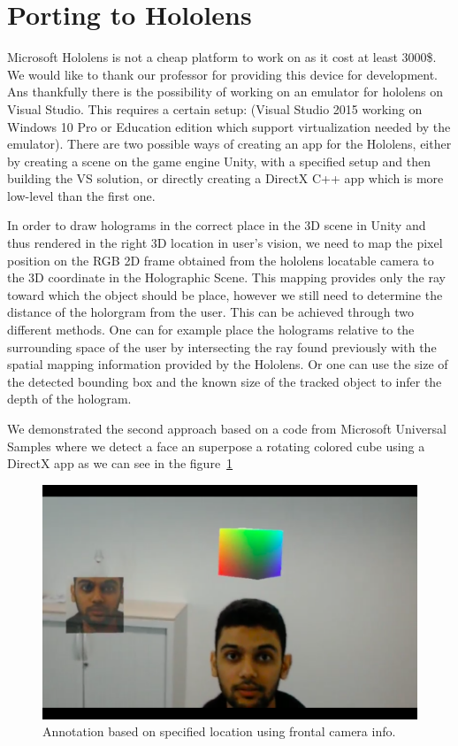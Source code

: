 \documentclass[10pt,twocolumn,letterpaper]{article}
\begin{document}
\section{Porting to Hololens}
Microsoft Hololens is not a cheap platform to work on as it cost at least 3000\$. We would like to thank our professor for providing this device for development. Ans thankfully there is the possibility of working on an emulator for hololens on Visual Studio. This requires a certain setup: (Visual Studio 2015 working on Windows 10 Pro or Education edition which support virtualization needed by the emulator). There are two possible ways of creating an app for the Hololens, either by creating a scene on the game engine Unity, with a specified setup and then building the VS solution, or directly creating a DirectX C++ app which is more low-level than the first one.

In order to draw holograms in the correct place in the 3D scene in Unity and thus rendered in the right 3D location in user's vision, we need to map the pixel position on the RGB 2D frame obtained from the hololens locatable camera to the 3D coordinate in the Holographic Scene. This mapping provides only the ray toward which the object should be place, however we still need to determine the distance of the holorgram from the user. This can be achieved through two different methods. One can for example place the holograms relative to the surrounding space of the user by intersecting the ray found previously with the spatial mapping information provided by the Hololens. Or one can use the size of the detected bounding box and the known size of the tracked object to infer the depth of the hologram. 

We demonstrated the second approach based on a code from Microsoft Universal Samples where we detect a face an superpose a rotating colored cube using a DirectX app as we can see in the figure~\ref{fig:Holo_FaceTracker}

\begin{figure}[t]
\begin{center}
   \includegraphics[width=0.8\linewidth]{HoloTracker}
\end{center}
   \caption{Annotation based on specified location using frontal camera info.}
\label{fig:Holo_FaceTracker}
\end{figure}

{\small


}
\end{document}
